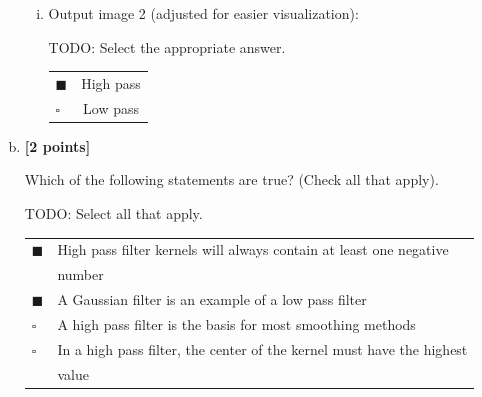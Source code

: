 \documentclass[11pt]{article}
\begin{document}
\begin{enumerate}[(a)]
\begin{enumerate}[(i)]
\item
Output image 2 (adjusted for easier visualization):\\
\begin{tcolorbox}[colback=white!5!white,colframe=green!75!black]
TODO: Select the appropriate answer. %

\begin{tabular}[h]{lc}
$\blacksquare$ & High pass \\
$\square$ & Low pass \\
\end{tabular}
\end{tcolorbox}
\end{enumerate}

\pagebreak
\item \textbf{[2 points]}
\begin{tcolorbox}[colback=orange!5!white,colframe=orange!75!black]
Which of the following statements are true? (Check all that apply).
\end{tcolorbox}

\begin{tcolorbox}[colback=white!5!white,colframe=green!75!black]
TODO: Select all that apply. %

\begin{tabular}[h]{ll}
$\blacksquare$ & High pass filter kernels will always contain at least one negative \\
& number \\
$\blacksquare$ & A Gaussian filter is an example of a low pass filter \\
$\square$ & A high pass filter is the basis for most smoothing methods \\
$\square$ & In a high pass filter, the center of the kernel must have the highest \\ 
& value \\
\end{tabular}
\end{tcolorbox}

\end{enumerate}

\end{document}
